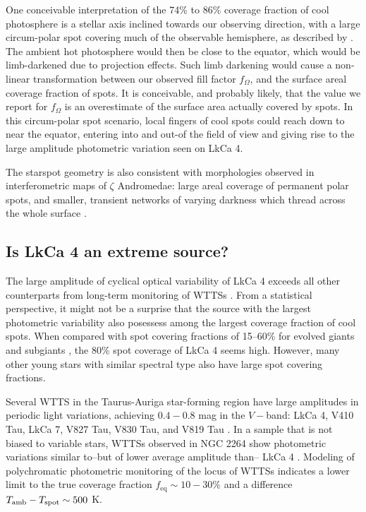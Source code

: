 \documentclass[twocolumn]{emulateapj}%
\newcommand{\name}{LkCa 4 }
\begin{document}
One conceivable interpretation of the 74\% to 86\% coverage fraction of cool photosphere is a stellar axis inclined towards our observing direction, with a large circum-polar spot covering much of the observable hemisphere, as described by \citet{donati14}.  The ambient hot photosphere would then be close to the equator, which would be limb-darkened due to projection effects.  Such limb darkening would cause a non-linear transformation between our observed fill factor $f_{\Omega}$, and the surface areal coverage fraction of spots.  It is conceivable, and probably likely, that the value we report for $f_{\Omega}$ is an overestimate of the surface area actually covered by spots.  In this circum-polar spot scenario, local fingers of cool spots could reach down to near the equator, entering into and out-of the field of view and giving rise to the large amplitude photometric variation seen on LkCa 4.  

The starspot geometry is also consistent with morphologies observed in interferometric maps of $\zeta$ Andromedae: large areal coverage of permanent polar spots, and smaller, transient networks of varying darkness which thread across the whole surface \citep{roettenbacher16}.



\subsection{Is \name an extreme source?}
The large amplitude of cyclical optical variability of LkCa 4 exceeds all other counterparts from long-term monitoring of WTTSs \citep{grankin08}.  From a statistical perspective, it might not be a surprise that the source with the largest photometric variability also posessess among the largest coverage fraction of cool spots.  When compared with spot covering fractions of 15--60\% for evolved giants and subgiants \citep{chugainov76,berdyugina05}, the 80\% spot coverage of LkCa 4 seems high.  However, many other young stars with similar spectral type also have large spot covering fractions.

Several WTTS in the Taurus-Auriga star-forming region have large amplitudes in periodic light variations, achieving $0.4-0.8$ mag in the $V-$band: LkCa 4, V410 Tau, LkCa 7, V827 Tau, V830 Tau, and V819 Tau \citep{grankin08}.  In a sample that is not biased to variable stars, 
WTTSs observed in NGC 2264 show photometric variations similar to--but of lower average amplitude than-- LkCa 4 \citep{cody14,venuti15}.  Modeling of polychromatic photometric monitoring of the locus of WTTSs indicates a lower limit to the true coverage fraction $f_{\mathrm{eq}}\sim10-30\%$ and a difference $T_\textrm{amb}-T_\textrm{spot}\sim500$ K. 
\end{document}
